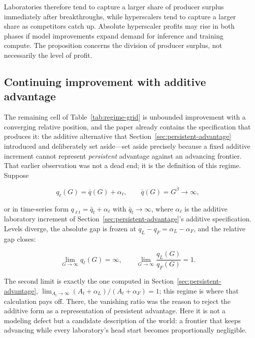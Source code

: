 \documentclass[11pt]{article}
\begin{document}
Laboratories therefore tend to capture a larger share of producer surplus immediately after breakthroughs, while hyperscalers tend to capture a larger share as competitors catch up. Absolute hyperscaler profits may rise in both phases if model improvements expand demand for inference and training compute. The proposition concerns the division of producer surplus, not necessarily the level of profit.

\subsection{Continuing improvement with additive advantage}
\label{subsec:additive-frontier}

The remaining cell of Table~\ref{tab:regime-grid} is unbounded improvement with a converging relative position, and the paper already contains the specification that produces it: the additive alternative that Section~\ref{sec:persistent-advantage} introduced and deliberately set aside---set aside precisely because a fixed additive increment cannot represent \emph{persistent} advantage against an advancing frontier. That earlier observation was not a dead end; it is the definition of this regime. Suppose

\begin{equation}q_\ell(G)=\bar q(G)+\alpha_\ell,\qquad \bar q(G)=G^{\beta}\rightarrow\infty,\end{equation}

or in time-series form $q_{\ell t}=\bar q_t+\alpha_\ell$ with $\bar q_t\rightarrow\infty$, where $\alpha_\ell$ is the additive laboratory increment of Section~\ref{sec:persistent-advantage}'s additive specification. Levels diverge, the absolute gap is frozen at $q_L-q_F=\alpha_L-\alpha_F$, and the relative gap closes:

\begin{equation}\lim_{G\rightarrow\infty}q_\ell(G)=\infty,\qquad \lim_{G\rightarrow\infty}\frac{q_L(G)}{q_F(G)}=1.\end{equation}

The second limit is exactly the one computed in Section~\ref{sec:persistent-advantage}, $\lim_{A_t\rightarrow\infty}(A_t+\alpha_L)/(A_t+\alpha_F)=1$; this regime is where that calculation pays off. There, the vanishing ratio was the reason to reject the additive form as a representation of persistent advantage. Here it is not a modeling defect but a candidate description of the world: a frontier that keeps advancing while every laboratory's head start becomes proportionally negligible.
\end{document}
